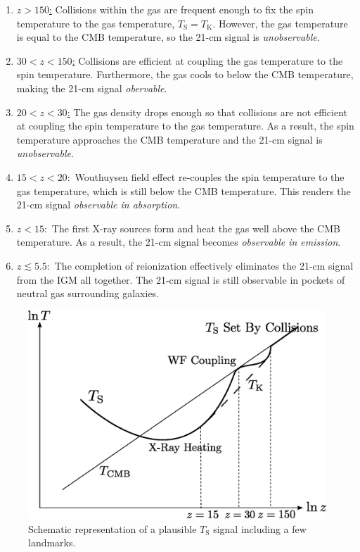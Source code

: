 \begin{enumerate}
\item [] \underline{$z > 150$:} Collisions within the gas are frequent enough to fix the spin temperature to the gas temperature, $T_{\text{S}} = T_{\text{K}}$. However, the gas temperature is equal to the CMB temperature, so the 21-cm signal is \textit{unobservable}.
\item [] \underline{$30 < z < 150$:} Collisions are efficient at coupling the gas temperature to the spin temperature. Furthermore, the gas cools to below the CMB temperature, making the 21-cm signal \textit{obervable}. 
\item [] \underline{$20 < z < 30$:} The gas density drops enough so that collisions are not efficient at coupling the spin temperature to the gas temperature. As a result, the spin temperature approaches the CMB temperature and the 21-cm signal is \textit{unobservable}. 
\item [] \underline{$15 < z < 20:$} Wouthuysen field effect re-couples the spin temperature to the gas temperature, which is still below the CMB temperature. This renders the 21-cm signal \textit{observable in absorption}. 
\item [] \underline{$ z < 15:$} The first X-ray sources form and heat the gas well above the CMB temperature. As a result, the 21-cm signal becomes \textit{observable in emission}.
\item [] \underline{$ z \lesssim 5.5:$} The completion of reionization effectively eliminates the 21-cm signal from the IGM all together. The 21-cm signal is still observable in pockets of neutral gas surrounding galaxies. 
\end{enumerate}


\begin{figure}[h]
  \centering
  \includegraphics[width=12cm]{TsEvolution.eps}
  \caption{Schematic representation of a plausible $T_{\text{S}}$ signal including a few landmarks.}
  \label{fig:TsEvolution}
\end{figure}



